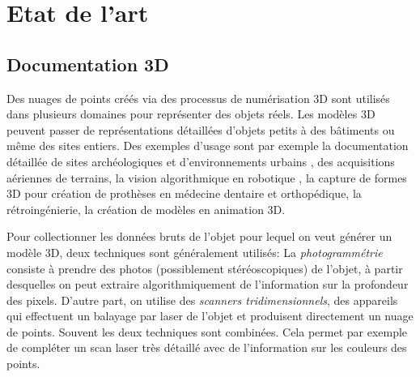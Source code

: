 \documentclass[a4paper,10pt]{scrreprt}
\begin{document}
\chapter{Etat de l'art}

\section{Documentation 3D}
Des nuages de points créés via des processus de numérisation 3D sont utilisés dans plusieurs domaines pour représenter des objets réels. Les modèles 3D peuvent passer de représentations détaillées d'objets petits à des bâtiments ou même des sites entiers. Des exemples d'usage sont par exemple la documentation détaillée de sites archéologiques \cite{Web1} \cite{Kein2011} \cite{Grus2012} et d'environnements urbains \cite{Kers2006}, des acquisitions aériennes de terrains, la vision algorithmique en robotique \cite{Bibe2003}, la capture de formes 3D pour création de prothèses en médecine dentaire et orthopédique, la rétroingénierie, la création de modèles en animation 3D.

Pour collectionner les données bruts de l'objet pour lequel on veut générer un modèle 3D, deux techniques sont généralement utilisés: La \emph{photogrammétrie} consiste à prendre des photos (possiblement stéréoscopiques) de l'objet, à partir desquelles on peut extraire algorithmiquement de l'information sur la profondeur des pixels. D'autre part, on utilise des \emph{scanners tridimensionnels}, des appareils qui effectuent un balayage par laser de l'objet et produisent directement un nuage de points. Souvent les deux techniques sont combinées. Cela permet par exemple de compléter un scan laser très détaillé avec de l'information sur les couleurs des points.
\end{document}
